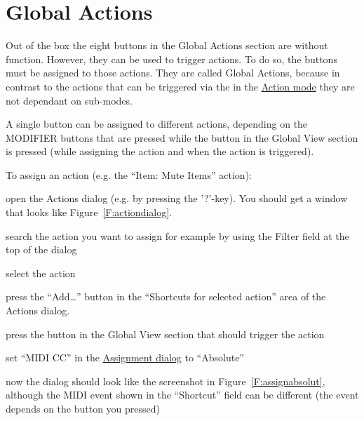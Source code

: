 \section{Global Actions}\label{globalactions}
Out of the box the eight buttons in the Global Actions  section are
without function. However, they can be used to trigger \reaper
actions. To do so, the buttons must be assigned to those actions. They
are called Global Actions, because in contrast to the actions that can
be triggered via the \vpots in the \hyperref[actionmode]{Action mode}
they are not dependant on sub-modes.


A single button can be assigned to different actions, depending on the MODIFIER
buttons that are pressed while the button in the Global View section is pressed
(while assigning the action and when the action is triggered). 


\noindent
To assign an action (e.g. the ``Item: Mute Items'' action):
\begin{compactitem}
\item open the Actions dialog (e.g. by pressing the '?'-key). You
should get a window that looks like Figure~\ref{F:actiondialog}.
\item search the action you want to assign for example by using the Filter field at
the top of the dialog
\item select the action 
\end{compactitem} %

\begin{compactitem}
\item press the ``Add\ldots'' button in the ``Shortcuts for selected
  action'' area of the Actions dialog. 
\item press the button in the Global View section that should trigger
  the action
\item set ``MIDI CC'' in the \hyperref[F:assignabsolut]{Assignment dialog} to
``Absolute''
\item now the dialog should look like the screenshot in
  Figure~\ref{F:assignabsolut}, although the MIDI event shown in the
  ``Shortcut'' field can be different (the event depends on the
  button you pressed)
\end{compactitem} %




